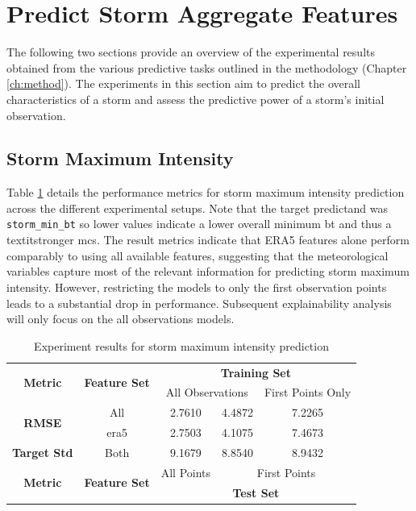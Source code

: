 \section{Predict Storm Aggregate Features}

The following two sections provide an overview of the experimental results obtained from the various predictive tasks outlined in the methodology (Chapter \ref{ch:method}). The experiments in this section aim to predict the overall characteristics of a storm and assess the predictive power of a storm's initial observation.

\subsection{Storm Maximum Intensity}

Table \ref{tab:storm_max_intensity_results} details the performance metrics for storm maximum intensity prediction across the different experimental setups. Note that the target predictand was \texttt{storm\_min\_bt} so lower values indicate a lower overall minimum \acrshort{bt} and thus a textit{stronger} \acrshort{mcs}. The result metrics indicate that ERA5 features alone perform comparably to using all available features, suggesting that the meteorological variables capture most of the relevant information for predicting storm maximum intensity. However, restricting the models to only the first observation points leads to a substantial drop in performance. Subsequent explainability analysis will only focus on the all observations models.

\begin{table}[ht]
\centering
\caption{Experiment results for storm maximum intensity prediction}
\label{tab:storm_max_intensity_results}
\begin{tabular}{|c|c|c|c|c|}
\hline
\multirow{2}{*}{\textbf{Metric}} & \multirow{2}{*}{\textbf{Feature Set}} & \multicolumn{3}{c|}{\textbf{Training Set} } \\ \cline{3-5}
 & & \multicolumn{2}{c|}{All Observations} & First Points Only \\
\hline \hline
\multirow{2}{*}{\textbf{RMSE}} & All & 2.7610 & 4.4872 & 7.2265 \\
 & \acrshort{era5} & 2.7503 & 4.1075 & 7.4673 \\
\hline
\textbf{Target Std} & Both & 9.1679 & 8.8540 & 8.9432 \\
\hline \hline
\multirow{2}{*}{\textbf{Metric}} & \multirow{2}{*}{\textbf{Feature Set}} & All Points & \multicolumn{2}{c|}{First Points} \\ \cline{3-5}
 & & \multicolumn{3}{c|}{\textbf{Test Set}} \\ 
\hline
\end{tabular}
\end{table}

